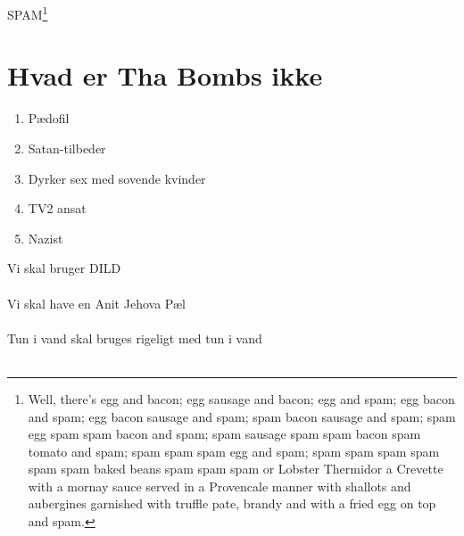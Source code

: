SPAM\footnote{Well, there's egg and bacon; egg sausage and bacon; egg and spam; egg bacon and spam; egg bacon sausage and spam; spam bacon sausage and spam; spam egg spam spam bacon and spam; spam sausage spam spam bacon spam tomato and spam; spam spam spam egg and spam; spam spam spam spam spam spam baked beans spam spam spam or Lobster Thermidor a Crevette with a mornay sauce served in a Provencale manner with shallots and aubergines garnished with truffle pate, brandy and with a fried egg on top and spam.}



\section{Hvad er Tha Bombs ikke}
\begin{enumerate}
\item Pædofil \cite{bib:url:Finn:Pedo}
\item Satan-tilbeder \cite{bib:url:Finn:Satan}
\item Dyrker sex med sovende kvinder \cite{bib:url:Finn:SovendeKvinder}
\item TV2 ansat \cite{bib:url:Finn:TV2}
\item Nazist\cite{bib:url:Finn:Nazist}
\end{enumerate}


Vi skal bruger DILD\cite{bib:url:Reklame:Dild}
\\
\\
Vi skal have en Anit Jehova Pæl \cite{bib:url:Reklame:Anti}
\\
\\
Tun i vand skal bruges \cite{bib:url:Reklame:Tun} rigeligt med tun i vand
\\
\\




